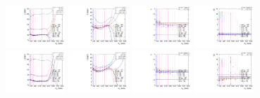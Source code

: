 \begin{figure}[htbp]
  \includegraphics[width=0.2\textwidth]{fig/analysis/paramSignalShape_allSig_MJJ_HP_nobb_DEtaLo_mean.pdf}
  \includegraphics[width=0.2\textwidth]{fig/analysis/paramSignalShape_allSig_MJJ_HP_nobb_DEtaLo_sigma.pdf}
  \includegraphics[width=0.2\textwidth]{fig/analysis/paramSignalShape_allSig_MJJ_HP_nobb_DEtaLo_alpha.pdf}
  \includegraphics[width=0.2\textwidth]{fig/analysis/paramSignalShape_allSig_MJJ_HP_nobb_DEtaLo_alpha2.pdf}\\
  \includegraphics[width=0.2\textwidth]{fig/analysis/paramSignalShape_allSig_MJJ_LP_nobb_DEtaLo_mean.pdf}
  \includegraphics[width=0.2\textwidth]{fig/analysis/paramSignalShape_allSig_MJJ_LP_nobb_DEtaLo_sigma.pdf}
  \includegraphics[width=0.2\textwidth]{fig/analysis/paramSignalShape_allSig_MJJ_LP_nobb_DEtaLo_alpha.pdf}
  \includegraphics[width=0.2\textwidth]{fig/analysis/paramSignalShape_allSig_MJJ_LP_nobb_DEtaLo_alpha2.pdf}\\

\end{figure}
